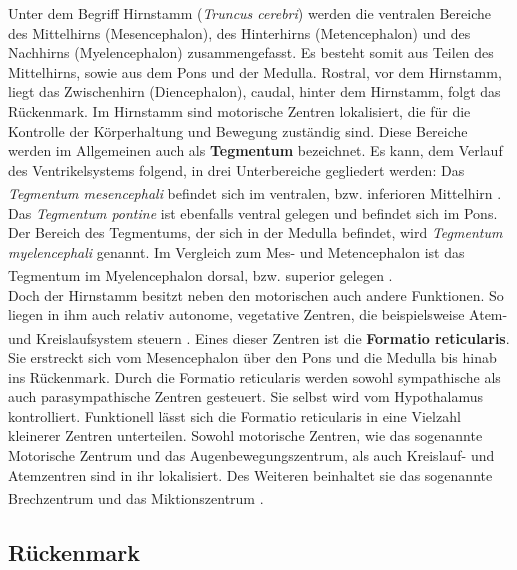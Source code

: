 \documentclass[12pt,a4paper,pdftex]{article}
\begin{document}
Unter dem Begriff Hirnstamm (\textit{Truncus cerebri}) werden die ventralen Bereiche des Mittelhirns (Mesencephalon), des Hinterhirns (Metencephalon) und des Nachhirns (Myelencephalon) zusammengefasst. Es besteht somit aus Teilen des Mittelhirns, sowie aus dem Pons und der Medulla. Rostral, vor dem Hirnstamm, liegt das Zwischenhirn (Diencephalon), caudal, hinter dem Hirnstamm, folgt das Rückenmark. Im Hirnstamm sind motorische Zentren lokalisiert, die für die Kontrolle der Körperhaltung und Bewegung zuständig sind. Diese Bereiche werden im Allgemeinen auch als \textbf{Tegmentum} bezeichnet. Es kann, dem Verlauf des Ventrikelsystems folgend, in drei Unterbereiche gegliedert werden: Das \textit{Tegmentum mesencephali} befindet sich im ventralen, bzw. inferioren Mittelhirn \textsuperscript{\cite[6]{trepel2011neuroanatomie}}. Das \textit{Tegmentum pontine} ist ebenfalls ventral gelegen und befindet sich im Pons. Der Bereich des Tegmentums, der sich in der Medulla befindet, wird \textit{Tegmentum myelencephali} genannt. Im Vergleich zum Mes- und Metencephalon ist das Tegmentum im Myelencephalon dorsal, bzw. superior gelegen \textsuperscript{\cite[5]{trepel2011neuroanatomie}}.\\

\noindent Doch der Hirnstamm besitzt neben den motorischen auch andere Funktionen. So liegen in ihm auch relativ autonome, vegetative Zentren, die beispielsweise Atem- und Kreislaufsystem steuern \textsuperscript{\cite[14]{penzlin2005tierphys}}. Eines dieser Zentren ist die \textbf{Formatio reticularis}. Sie erstreckt sich vom Mesencephalon über den Pons und die Medulla bis hinab ins Rückenmark. Durch die Formatio reticularis werden sowohl sympathische als auch parasympathische Zentren gesteuert. Sie selbst wird vom Hypothalamus kontrolliert. Funktionell lässt sich die Formatio reticularis in eine Vielzahl kleinerer Zentren unterteilen. Sowohl motorische Zentren, wie das sogenannte Motorische Zentrum und das Augenbewegungszentrum, als auch Kreislauf- und Atemzentren sind in ihr lokalisiert. Des Weiteren beinhaltet sie das sogenannte Brechzentrum und das Miktionszentrum \textsuperscript{\cite[6]{trepel2011neuroanatomie}}.


\subsection{Rückenmark}
\label{subsec:Rueckenmark} 
\end{document}
